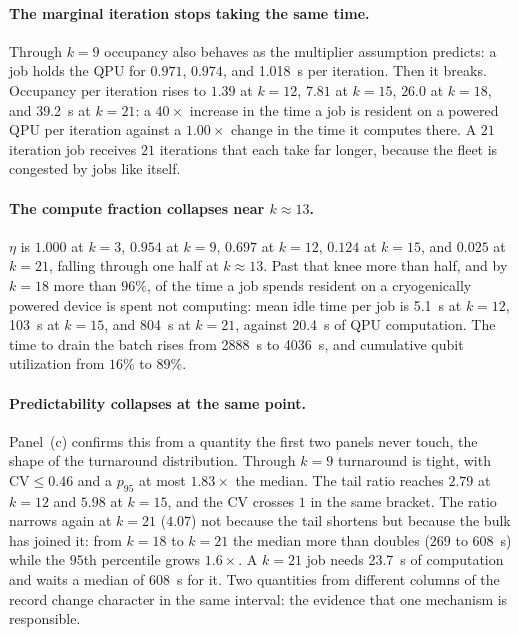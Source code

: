 \paragraph{The marginal iteration stops taking the same time.}
Through $k=9$ occupancy also behaves as the multiplier assumption predicts: a job holds the QPU for $0.971$, $0.974$, and \qty{1.018}{\second} per iteration. Then it breaks. Occupancy per iteration rises to $1.39$ at $k=12$, $7.81$ at $k=15$, $26.0$ at $k=18$, and \qty{39.2}{\second} at $k=21$: a $40\times$ increase in the time a job is resident on a powered QPU per iteration against a $1.00\times$ change in the time it computes there. A $21$ iteration job receives $21$ iterations that each take far longer, because the fleet is congested by jobs like itself.

\paragraph{The compute fraction collapses near $k \approx 13$.}
$\eta$ is $1.000$ at $k=3$, $0.954$ at $k=9$, $0.697$ at $k=12$, $0.124$ at $k=15$, and $0.025$ at $k=21$, falling through one half at $k \approx 13$. Past that knee more than half, and by $k=18$ more than $96\%$, of the time a job spends resident on a cryogenically powered device is spent not computing: mean idle time per job is \qty{5.1}{\second} at $k=12$, \qty{103}{\second} at $k=15$, and \qty{804}{\second} at $k=21$, against \qty{20.4}{\second} of QPU computation. The time to drain the batch rises from \qty{2888}{\second} to \qty{4036}{\second}, and cumulative qubit utilization from $16\%$ to $89\%$.

\paragraph{Predictability collapses at the same point.}
Panel~(c) confirms this from a quantity the first two panels never touch, the shape of the turnaround distribution. Through $k=9$ turnaround is tight, with $\mathrm{CV} \le 0.46$ and a $p_{95}$ at most $1.83\times$ the median. The tail ratio reaches $2.79$ at $k=12$ and $5.98$ at $k=15$, and the CV crosses $1$ in the same bracket. The ratio narrows again at $k=21$ ($4.07$) not because the tail shortens but because the bulk has joined it: from $k=18$ to $k=21$ the median more than doubles ($269$ to \qty{608}{\second}) while the $95$th percentile grows $1.6\times$. A $k=21$ job needs \qty{23.7}{\second} of computation and waits a median of \qty{608}{\second} for it. Two quantities from different columns of the record change character in the same interval: the evidence that one mechanism is responsible.

